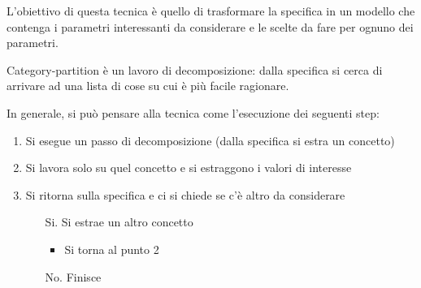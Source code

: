 L'obiettivo di questa tecnica è quello di trasformare la specifica in un modello che contenga i parametri interessanti da considerare e le scelte da fare per ognuno dei parametri.

Category-partition è un lavoro di decomposizione: dalla specifica si cerca di arrivare ad una lista di cose su cui è più facile ragionare.

In generale, si può pensare alla tecnica come l'esecuzione dei seguenti step: \begin{enumerate}
    \item Si esegue un passo di decomposizione (dalla specifica si estra un concetto)
    \item Si lavora solo su quel concetto e si estraggono i valori di interesse 
    \item Si ritorna sulla specifica e ci si chiede se c'è altro da considerare \begin{itemize}
        \item[Si.] Si estrae un altro concetto \begin{itemize}
            \item Si torna al punto 2
        \end{itemize} 
        \item[No.] Finisce 
    \end{itemize}
\end{enumerate}